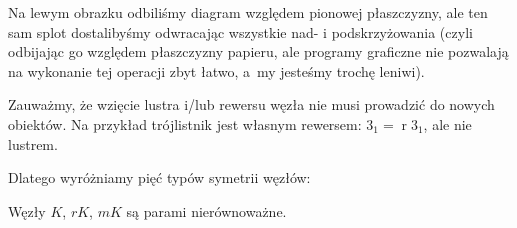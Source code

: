 Na lewym obrazku odbiliśmy diagram względem pionowej płaszczyzny, ale ten sam splot dostalibyśmy odwracając wszystkie nad- i podskrzyżowania (czyli odbijając go względem płaszczyzny papieru, ale programy graficzne nie pozwalają na wykonanie tej operacji zbyt łatwo, a~my jesteśmy trochę leniwi).

Zauważmy, że wzięcie lustra i/lub rewersu węzła nie musi prowadzić do nowych obiektów.
Na przykład trójlistnik jest własnym rewersem: $3_1 = \operatorname{r} 3_1$, ale nie lustrem.

Dlatego wyróżniamy pięć typów symetrii węzłów:

\begin{definition}
%
%
    Węzły $K$, $rK$, $mK$ są parami nierównoważne. %
\end{definition}

